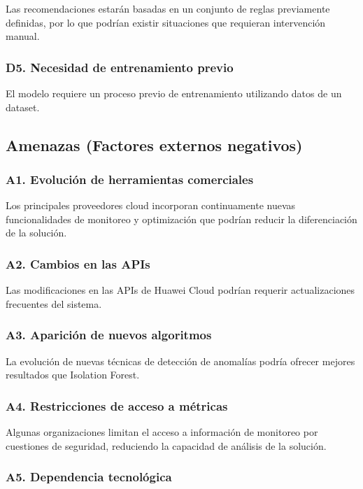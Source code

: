 Las recomendaciones estarán basadas en un conjunto de reglas previamente definidas, por lo que podrían existir situaciones que requieran intervención manual.

\subsubsection*{D5. Necesidad de entrenamiento previo}

El modelo requiere un proceso previo de entrenamiento utilizando datos de un dataset.

\subsection{Amenazas (Factores externos negativos)}

\subsubsection*{A1. Evolución de herramientas comerciales}

Los principales proveedores cloud incorporan continuamente nuevas funcionalidades de monitoreo y optimización que podrían reducir la diferenciación de la solución.

\subsubsection*{A2. Cambios en las APIs}

Las modificaciones en las APIs de Huawei Cloud podrían requerir actualizaciones frecuentes del sistema.

\subsubsection*{A3. Aparición de nuevos algoritmos}

La evolución de nuevas técnicas de detección de anomalías podría ofrecer mejores resultados que Isolation Forest.

\subsubsection*{A4. Restricciones de acceso a métricas}

Algunas organizaciones limitan el acceso a información de monitoreo por cuestiones de seguridad, reduciendo la capacidad de análisis de la solución.

\subsubsection*{A5. Dependencia tecnológica}

